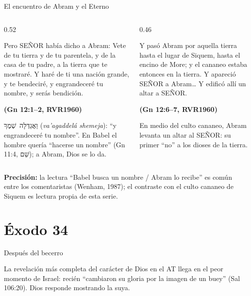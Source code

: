 \documentclass[hyperref={bookmarks=false},aspectratio=169]{beamer}
\newcommand{\heb}[1]{\mbox{\foreignlanguage{hebrew}{#1}}}
\newcommand{\SENOR}{S{\fontsize{0.78em}{1em}\selectfont EÑOR}}
\newcommand{\fuente}[1]{\par\hfill{\upshape\bfseries\footnotesize\textcolor{azul}{#1}}}
\newcommand{\precision}[1]{{\footnotesize\color{gris}\textbf{Precisión:} #1}}
\begin{document}
\begin{frame}{El encuentro de Abram y el Eterno}
\begin{columns}[t,onlytextwidth]
\begin{column}{0.52\textwidth}
\begin{cita}Pero \SENOR{} había dicho a Abram: Vete de tu tierra y de tu parentela, y de la casa de tu padre, a la tierra que te mostraré. Y haré de ti una nación grande, y te bendeciré, y engrandeceré tu nombre, y serás bendición.\fuente{(Gn 12:1--2, RVR1960)}\end{cita}
\scriptsize\heb{וַאֲגַדְּלָה שְׁמֶךָ} (\emph{va'agaddelá shemeja}): ``y engrandeceré tu nombre''. En Babel el hombre quería ``hacerse un nombre'' (Gn 11:4, \heb{שֵׁם}); a Abram, Dios se lo da.
\end{column}
\begin{column}{0.46\textwidth}
\begin{cita}Y pasó Abram por aquella tierra hasta el lugar de Siquem, hasta el encino de More; y el cananeo estaba entonces en la tierra. Y apareció \SENOR{} a Abram\ldots{} Y edificó allí un altar a \SENOR.\fuente{(Gn 12:6--7, RVR1960)}\end{cita}
\small En medio del culto cananeo, Abram levanta un altar al \SENOR: su primer ``no'' a los dioses de la tierra.
\end{column}
\end{columns}
\precision{la lectura ``Babel busca un nombre / Abram lo recibe'' es común entre los comentaristas (Wenham, 1987); el contraste con el culto cananeo de Siquem es lectura propia de esta serie.}
\end{frame}

\section{Éxodo 34}

\begin{frame}{Después del becerro}
\centering
{}\par\medskip
\small\RaggedRight La revelación más completa del carácter de Dios en el AT llega en el peor momento de Israel: recién ``cambiaron su gloria por la imagen de un buey'' (Sal 106:20). Dios responde mostrando la suya.
\end{frame}
\end{document}
